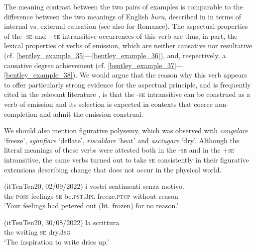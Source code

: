 \documentclass[output=paper,colorlinks,citecolor=brown
]{langscibook}
\begin{document}
The meaning contrast between the two pairs of examples is comparable to the difference between the two meanings of English \textit{burn}, described in \citet[101]{levin1995unaccusativity} in terms of internal vs. external causation (see also \cite{bentley2023internally} for Romance). The aspectual properties of the -\textsc{se} and +\textsc{se} intransitive occurrences of this verb are thus, in part, the lexical properties of verbs of emission, which are neither causative nor resultative (cf. \ref{bentley_example_35}—\ref{bentley_example_36}), and, respectively, a causative degree achievement (cf. \ref{bentley_example_37}—\ref{bentley_example_38}). We would argue that the reason why this verb appears to offer particularly strong evidence for the aspectual principle, and is frequently cited in the relevant literature \citep{jezek2003classi,folli2005consuming,cennamo2011anticausative,cennamo2012aspectual}, is that the -\textsc{se} intransitive can be construed as a verb of emission and its selection is expected in contexts that coerce non-completion and admit the emission construal.

We should also mention figurative polysemy, which was observed with \textit{congelare} ‘freeze’, \textit{sgonfiare} ‘deflate’, \textit{riscaldare} ‘heat’ and \textit{asciugare} ‘dry’. Although the literal meanings of these verbs were attested both in the -\textsc{se} and in the +\textsc{se} intransitive, the same verbs turned out to take \textsc{se} consistently in their figurative extensions describing change that does not occur in the physical world.

\hspace*{\fill}(itTenTen20, 02/09/2022)\quad
\ea \label{bentley_example_39}
    \gll  {\ldots}  i			vostri		sentimenti				 								senza			motivo.  \\
    	{} 	the	\textsc{poss}			feelings			\textsc{se}		be.\textsc{pst}.3\textsc{pl}		freeze.\textsc{ptcp}		without	reason \\
    \glt 	‘Your feelings had petered out (lit. frozen) for no reason.’	
\z

\hspace*{\fill}(itTenTen20, 30/08/2022)\quad
\ea \label{bentley_example_40}
    \gll  {\ldots}  la		scrittura				  \\
    	{} the	writing		\textsc{se}		dry.3\textsc{sg} \\
    \glt ‘The inspiration to write dries up.’
\z
\end{document}
